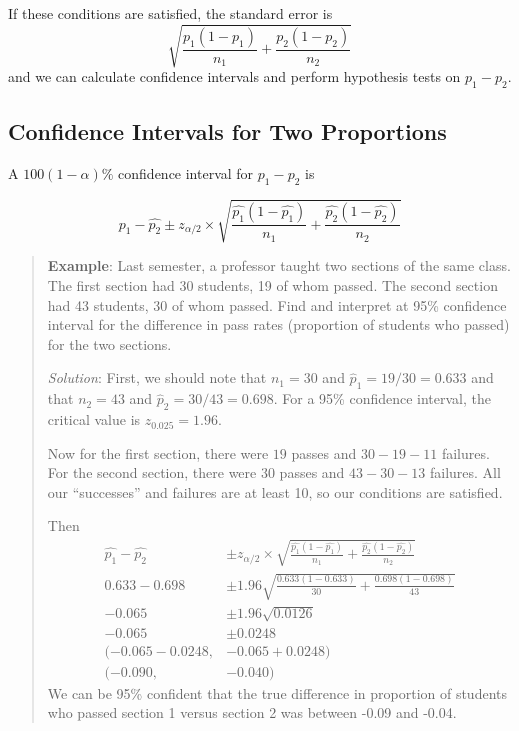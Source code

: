 \documentclass[
]{book}
\begin{document}
If these conditions are satisfied, the standard error is \[\sqrt{\frac{p_1(1-p_1)}{n_1} + \frac{p_2(1-p_2)}{n_2}}\] and we can calculate confidence intervals and perform hypothesis tests on \(p_1 - p_2\).

\subsection{Confidence Intervals for Two Proportions}\label{confidence-intervals-for-two-proportions}

A \(100(1-\alpha)\%\) confidence interval for \(p_1-p_2\) is

\[\hat{p_1} - \hat{p_2} \pm z_{\alpha/2} \times \sqrt{\frac{\hat{p_1}(1-\hat{p_1})}{n_1} + \frac{\hat{p_2}(1-\hat{p_2})}{n_2}}\]

\begin{quote}
\textbf{Example}: Last semester, a professor taught two sections of the same class. The first section had 30 students, 19 of whom passed. The second section had 43 students, 30 of whom passed. Find and interpret at 95\% confidence interval for the difference in pass rates (proportion of students who passed) for the two sections.

\emph{Solution}: First, we should note that \(n_1=30\) and \(\hat{p}_1 = 19/30 = 0.633\) and that \(n_2=43\) and \(\hat{p}_2 = 30/43 = 0.698\). For a 95\% confidence interval, the critical value is \(z_{0.025} = 1.96\).

Now for the first section, there were \(19\) passes and \(30-19-11\) failures. For the second section, there were \(30\) passes and \(43-30-13\) failures. All our ``successes'' and failures are at least 10, so our conditions are satisfied.

Then \[\begin{aligned}
  \hat{p_1} - \hat{p_2} &\pm z_{\alpha/2} \times \sqrt{\frac{\hat{p_1}(1-\hat{p_1})}{n_1} + \frac{\hat{p_2}(1-\hat{p_2})}{n_2}} \\
  0.633 - 0.698 &\pm 1.96 \sqrt{\frac{0.633(1-0.633)}{30} + \frac{0.698(1-0.698)}{43}} \\
-0.065 &\pm 1.96\sqrt{0.0126} \\
-0.065 &\pm 0.0248 \\
(-0.065-0.0248, &-0.065 + 0.0248) \\
(-0.090, & -0.040)
\end{aligned}\]
We can be 95\% confident that the true difference in proportion of students who passed section 1 versus section 2 was between -0.09 and -0.04.
\end{quote}
\end{document}
